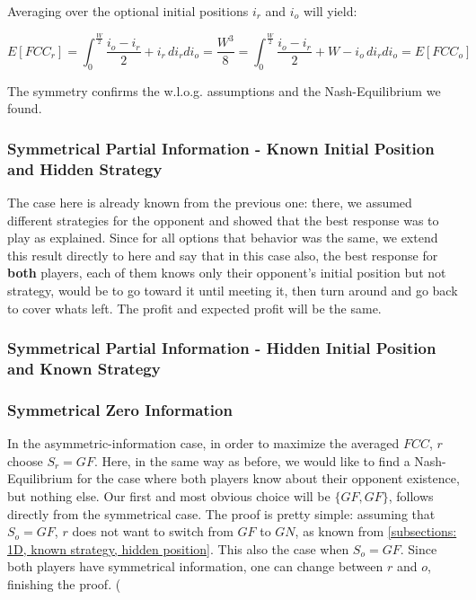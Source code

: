 \documentclass[a4paper,10pt]{article}
\newcommand\rob{\ensuremath{r}\xspace}
\newcommand\opp{\ensuremath{o}\xspace}
\newcommand{\w}{\ensuremath{W}\xspace}
\newcommand{\fcc}{\ensuremath{FCC}\xspace}
\newcommand{\gn}{\ensuremath{GN}\xspace}
\newcommand{\gf}{\ensuremath{GF}\xspace}
\begin{document}
Averaging over the optional initial positions $i_{\rob}$ and $i_{\opp}$ will yield:

\[E\left[\fcc_{\rob}\right]=\int_{0}^{\frac{\w}{2}}{\frac{i_{\opp} - i_{\rob}}{2}+i_{\rob}} \, di_{\rob} di_{\opp}=\frac{\w^3}{8}=\int_{0}^{\frac{\w}{2}}{\frac{i_{\opp} - i_{\rob}}{2}+\w-i_{\opp}} \, di_{\rob} di_{\opp}=E\left[\fcc_{\opp}\right]\]

The symmetry confirms the w.l.o.g. assumptions and the Nash-Equilibrium we found.

\subsubsection{Symmetrical Partial Information - Known Initial Position and Hidden Strategy}
The case here is already known from the previous one: there, we assumed different strategies for the opponent and showed that the best response was to play as explained. Since for all options that behavior was the same, we extend this result directly to here and say that in this case also, the best response for \textbf{both} players, each of them knows only their opponent's initial position but not strategy, would be to go toward it until meeting it, then turn around and go back to cover whats left.
The profit and expected profit will be the same.

\subsubsection{Symmetrical Partial Information - Hidden Initial Position and Known Strategy}

\subsubsection{Symmetrical Zero Information}
In the asymmetric-information case, in order to maximize the averaged \fcc, \rob choose $S_\rob=\gf$.
Here, in the same way as before, we would like to find a Nash-Equilibrium for the case where both players know about their opponent existence, but nothing else.
Our first and most obvious choice will be $\lbrace \gf, \gf \rbrace$, follows directly from the symmetrical case.
The proof is pretty simple: assuming that $S_\opp = \gf$, \rob does not want to switch from \gf to \gn, as known from \ref{subsections: 1D, known strategy, hidden position}. This also the case when $S_\opp=\gf$.
Since both players have symmetrical information, one can change between \rob and \opp, finishing the proof. (\todo
\end{document}
